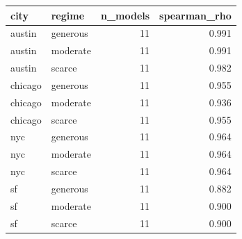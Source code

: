 \begin{tabular}{llrr}
\toprule
city & regime & n\_models & spearman\_rho \\
\midrule
austin & generous & 11 & 0.991 \\
austin & moderate & 11 & 0.991 \\
austin & scarce & 11 & 0.982 \\
chicago & generous & 11 & 0.955 \\
chicago & moderate & 11 & 0.936 \\
chicago & scarce & 11 & 0.955 \\
nyc & generous & 11 & 0.964 \\
nyc & moderate & 11 & 0.964 \\
nyc & scarce & 11 & 0.964 \\
sf & generous & 11 & 0.882 \\
sf & moderate & 11 & 0.900 \\
sf & scarce & 11 & 0.900 \\
\bottomrule
\end{tabular}
